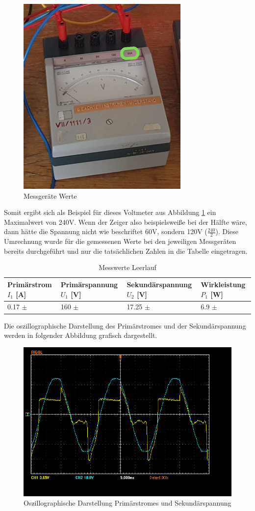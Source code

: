 \documentclass[12pt,a4paper,twoside]{article}
\begin{document}
\begin{figure}[H]
    \centering
    \includegraphics[width=0.4\linewidth, angle=0]{nudes/VoltmeterBeschriftung.png}
    \caption{Messgeräte Werte}
    \label{fig:MessgerätWerte}
\end{figure}

\noindent
Somit ergibt sich als Beispiel für dieses Voltmeter aus Abbildung \ref{fig:MessgerätWerte} ein Maximalwert von 240V. Wenn der Zeiger also beispielsweiße bei der Hälfte wäre, dann hätte die Spannung nicht wie beschriftet 60V, sondern 120V ($\frac{240}{2}$). Diese Umrechnung wurde für die gemessenen Werte bei den jeweiligen Messgeräten bereits durchgeführt und nur die tatsächlichen Zahlen in die Tabelle eingetragen.

\begin{table}[H]
    \centering
    \caption{Messwerte Leerlauf}
    \label{tab:messwerteLeerlauf}
    \begin{tabular}{| l | l | l | l |}
        \hline
        Primärstrom $I_{1}$ [A]  & Primärspannung $U_{1}$ [V] & Sekundärspannung $U_{2}$ [V] & Wirkleistung $P_{1}$ [W] \\
        \hline
        0.17 $\pm$  & 160 $\pm$  & 17.25 $\pm$  & 6.9 $\pm$  \\
        \hline
    \end{tabular}
\end{table}

\noindent
Die oszillographische Darstellung des Primärstromes und der Sekundärspannung werden in folgender Abbildung grafisch dargestellt.

\begin{figure}[H]
    \centering
    \includegraphics[width=0.6\linewidth, angle=0]{nudes/A1 Oszi.jpg}
    \caption{Oszillographische Darstellung Primärstromes und Sekundärspannung}
    \label{fig:OszilloskopA}
\end{figure}
\end{document}
